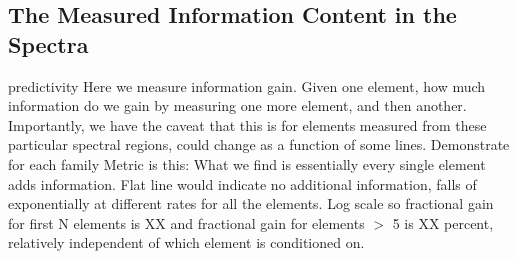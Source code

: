 \documentclass[a4paper,fleqn,usenatbib]{mnras}
\begin{document}
\subsection{The Measured Information Content in the Spectra}



predictivity
Here we measure information gain. Given one element, how much information do we gain by measuring one more element, and then another. Importantly, we have the caveat that this is for elements measured from these particular spectral regions, could change as a function of some lines. 
Demonstrate for each family
Metric is this: 
What we find is essentially every single element adds information. Flat line would indicate no additional information, falls of exponentially at different rates for all the elements. Log scale so fractional gain for first N elements is XX and fractional gain for elements $>$ 5 is XX percent, relatively independent of which element is conditioned on. 
\end{document}
